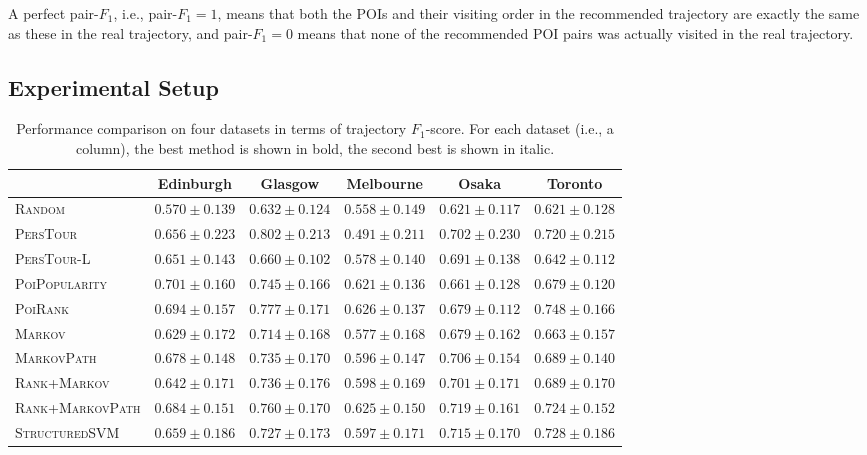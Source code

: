 A perfect pair-$F_1$, i.e., pair-$F_1 = 1$, means that both the POIs and their visiting order in the
recommended trajectory are exactly the same as these in the real trajectory,
and pair-$F_1 = 0$ means that none of the recommended POI pairs was actually visited in the real trajectory.


\subsection{Experimental Setup}
\label{sec:setup}

\begin{table}[t]
\caption{Performance comparison on four datasets in terms of trajectory $F_1$-score.
         For each dataset (i.e., a column), the best method is shown in bold, the second best is shown in italic.}
\label{tab:f1}
\centering
\begin{tabular}{l|ccccc} \hline
 & Edinburgh & Glasgow & Melbourne & Osaka & Toronto \\ \hline
\textsc{Random} & $0.570\pm0.139$ & $0.632\pm0.124$ & $0.558\pm0.149$ & $0.621\pm0.117$ & $0.621\pm0.128$ \\
\textsc{PersTour}\cite{ijcai15} & $0.656\pm0.223$ & $\mathbf{0.802\pm0.213}$ & $0.491\pm0.211$ & $0.702\pm0.230$ & $0.720\pm0.215$ \\
\textsc{PersTour-L} & $0.651\pm0.143$ & $0.660\pm0.102$ & $0.578\pm0.140$ & $0.691\pm0.138$ & $0.642\pm0.112$ \\
\textsc{PoiPopularity} & $\mathbf{0.701\pm0.160}$ & $0.745\pm0.166$ & $0.621\pm0.136$ & $0.661\pm0.128$ & $0.679\pm0.120$ \\
\textsc{PoiRank} & $\mathit{0.694\pm0.157}$ & $\mathit{0.777\pm0.171}$ & $\mathbf{0.626\pm0.137}$ & $0.679\pm0.112$ & $\mathbf{0.748\pm0.166}$ \\
\textsc{Markov} & $0.629\pm0.172$ & $0.714\pm0.168$ & $0.577\pm0.168$ & $0.679\pm0.162$ & $0.663\pm0.157$ \\
\textsc{MarkovPath} & $0.678\pm0.148$ & $0.735\pm0.170$ & $0.596\pm0.147$ & $0.706\pm0.154$ & $0.689\pm0.140$ \\
\textsc{Rank+Markov} & $0.642\pm0.171$ & $0.736\pm0.176$ & $0.598\pm0.169$ & $0.701\pm0.171$ & $0.689\pm0.170$ \\
\textsc{Rank+MarkovPath} & $0.684\pm0.151$ & $0.760\pm0.170$ & $\mathit{0.625\pm0.150}$ & $\mathbf{0.719\pm0.161}$ & $0.724\pm0.152$ \\
\textsc{StructuredSVM} & $0.659\pm0.186$ & $0.727\pm0.173$ & $0.597\pm0.171$ & $\mathit{0.715\pm0.170}$ & $\mathit{0.728\pm0.186}$ \\
\hline
\end{tabular}
\end{table}


